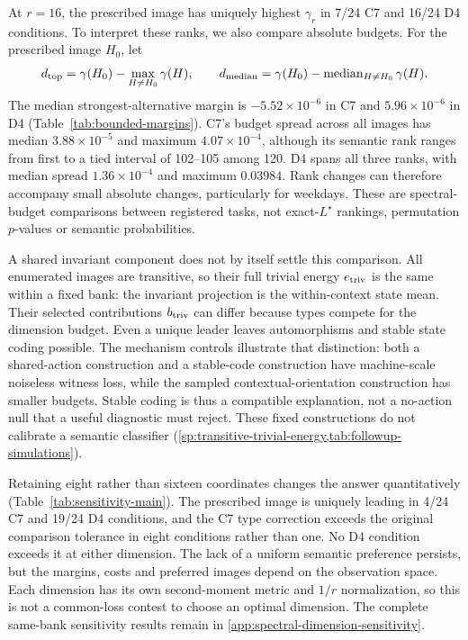 At $r=16$, the prescribed image has uniquely highest $\gamma_r$ in 7/24 C7 and 16/24 D4 conditions. To interpret these ranks, we also compare absolute budgets. For the prescribed image $H_0$, let
\[
 d_{\rm top}=\gamma(H_0)-\max_{H\ne H_0}\gamma(H),\qquad
 d_{\rm median}=\gamma(H_0)-\operatorname{median}_{H\ne H_0}\gamma(H).
\]
The median strongest-alternative margin is $-5.52\times10^{-6}$ in C7 and $5.96\times10^{-6}$ in D4 (Table~\ref{tab:bounded-margins}). C7's budget spread across all images has median $3.88\times10^{-5}$ and maximum $4.07\times10^{-4}$, although its semantic rank ranges from first to a tied interval of 102--105 among 120. D4 spans all three ranks, with median spread $1.36\times10^{-4}$ and maximum $0.03984$. Rank changes can therefore accompany small absolute changes, particularly for weekdays. These are spectral-budget comparisons between registered tasks, not exact-$L^\star$ rankings, permutation $p$-values or semantic probabilities.

\begin{table}[t]
\centering\small

\caption{Registration margins at $r=16$ in all 24 fixed conditions per domain. Positive values favor the prescribed image over the strongest or median alternative. U/T/B counts unique leading, tied leading and behind under the recorded pairwise tolerance. The margins measure spectral-budget differences between coherent target actions.}
\label{tab:bounded-margins}
\end{table}

A shared invariant component does not by itself settle this comparison. All enumerated images are transitive, so their full trivial energy $e_{\rm triv}$ is the same within a fixed bank: the invariant projection is the within-context state mean. Their selected contributions $b_{\rm triv}$ can differ because types compete for the dimension budget. Even a unique leader leaves automorphisms and stable state coding possible. The mechanism controls illustrate that distinction: both a shared-action construction and a stable-code construction have machine-scale noiseless witness loss, while the sampled contextual-orientation construction has smaller budgets. Stable coding is thus a compatible explanation, not a no-action null that a useful diagnostic must reject. These fixed constructions do not calibrate a semantic classifier (\cref{sp:transitive-trivial-energy,tab:followup-simulations}).


Retaining eight rather than sixteen coordinates changes the answer quantitatively (Table~\ref{tab:sensitivity-main}). The prescribed image is uniquely leading in 4/24 C7 and 19/24 D4 conditions, and the C7 type correction exceeds the original comparison tolerance in eight conditions rather than one. No D4 condition exceeds it at either dimension. The lack of a uniform semantic preference persists, but the margins, costs and preferred images depend on the observation space. Each dimension has its own second-moment metric and $1/r$ normalization, so this is not a common-loss contest to choose an optimal dimension. The complete same-bank sensitivity results remain in \cref{app:spectral-dimension-sensitivity}.

